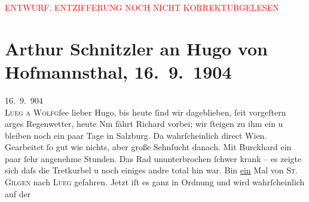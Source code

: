 
\begin{center}
            \textcolor{red}{ENTWURF. ENTZIFFERUNG NOCH NICHT KORREKTURGELESEN}
                      \end{center}
            
               \section[Arthur Schnitzler an Hugo von Hofmannsthal, 16. 9. 1904]{ Arthur Schnitzler an Hugo von Hofmannsthal, 16. 9. 1904}\nopagebreak{}\rehead{ }\begin{ledgroupsized}[t]{13cm}\normalsize\beginnumbering{} \toendnotes[C]{\smallbreak\pagebreak[2]} 
\toendnotes[C]{\smallbreak}\pstart
           \raggedleft{}{\pb}16. 9. 904{\\}\textsc{Lueg a Wolfg}ſee\pend
           \pstart
           lieber Hugo, bis heute ſind wir dageblieben, ſeit vorgeſtern arges
               Regenwetter, heute Nm fährt Richard
               vorbei; wir ſteigen zu ihm ein u bleiben noch ein paar Tage in Salzburg. Da{\geminationn} wahrſcheinlich direct
                  Wien. Gearbeitet ſo gut wie nichts, aber große {\pb}Sehnſucht danach. Mit Burckhard ein paar ſehr angenehme Stunden. Das Rad ununterbrochen ſchwer
               krank – es zeigte sich daſs die Tretkurbel u noch einiges andre total hin war. Bin
                  \uline{ein} Mal von \textsc{St. Gilgen} nach \textsc{Lueg} gefahren. Jetzt iſt es ganz in Ordnung und wird wahrſcheinlich auf der

\end{ledgroupsized}
